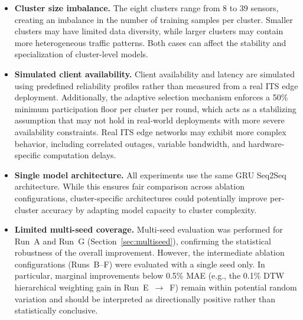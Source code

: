 \begin{itemize}
    \item \textbf{Cluster size imbalance.} The eight clusters range from 8 to 39 sensors, creating an imbalance in the number of training samples per cluster. Smaller clusters may have limited data diversity, while larger clusters may contain more heterogeneous traffic patterns. Both cases can affect the stability and specialization of cluster-level models.
    \item \textbf{Simulated client availability.} Client availability and latency are simulated using predefined reliability profiles rather than measured from a real ITS edge deployment. Additionally, the adaptive selection mechanism enforces a 50\% minimum participation floor per cluster per round, which acts as a stabilizing assumption that may not hold in real-world deployments with more severe availability constraints. Real ITS edge networks may exhibit more complex behavior, including correlated outages, variable bandwidth, and hardware-specific computation delays.
    \item \textbf{Single model architecture.} All experiments use the same GRU Seq2Seq architecture. While this ensures fair comparison across ablation configurations, cluster-specific architectures could potentially improve per-cluster accuracy by adapting model capacity to cluster complexity.
    \item \textbf{Limited multi-seed coverage.} Multi-seed evaluation was performed for Run~A and Run~G (Section~\ref{sec:multiseed}), confirming the statistical robustness of the overall improvement. However, the intermediate ablation configurations (Runs~B--F) were evaluated with a single seed only. In particular, marginal improvements below 0.5\% MAE (e.g., the 0.1\% DTW hierarchical weighting gain in Run~E~$\to$~F) remain within potential random variation and should be interpreted as directionally positive rather than statistically conclusive.
\end{itemize}